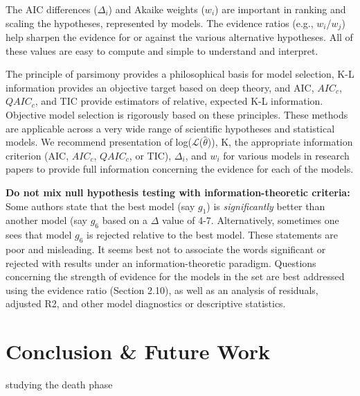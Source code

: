 \documentclass[11pt]{article}
\begin{document}
\begin{linenumbers}
	\par The AIC differences ($\Delta_i$) and Akaike weights ($w_i$) are important in ranking and scaling the hypotheses, represented by models. The evidence ratios (e.g., $w_i$/$w_j$) help sharpen the evidence for or against the various alternative hypotheses. All of these values are easy to compute and simple to understand and interpret.\\

	\par The principle of parsimony provides a philosophical basis for model selection, K-L information provides an objective target based on deep theory, and AIC, $AIC_c$, $QAIC_c$, and TIC provide estimators of relative, expected K-L information. Objective model selection is rigorously based on these principles. These methods are applicable across a very wide range of scientific hypotheses and statistical models. We recommend presentation of log($\mathcal{L}$($\hat\theta$)), K, the appropriate information criterion (AIC, $AIC_c$, $QAIC_c$, or TIC), $\Delta_i$, and $w_i$ for various models in research papers to provide full information concerning the evidence for each of the models.\\

	\par \textbf{Do not mix null hypothesis testing with information-theoretic criteria:}\\
	Some authors state that the best model (say $g_1$) is \emph{significantly} better than another model (say $g_6$ based on a $\Delta$ value of 4-7. Alternatively, sometimes one sees that model $g_6$ is rejected relative to the best model. These statements are poor and misleading. It seems best not to associate the words significant or rejected with results under an information-theoretic paradigm. Questions concerning the strength of evidence for the models in the set are best addressed using the evidence ratio (Section 2.10), as well as an analysis of residuals, adjusted R2, and other model diagnostics or descriptive statistics.

	\section{Conclusion \& Future Work}
	studying the death phase %
	
	\end{linenumbers}

	
    
\end{document}
